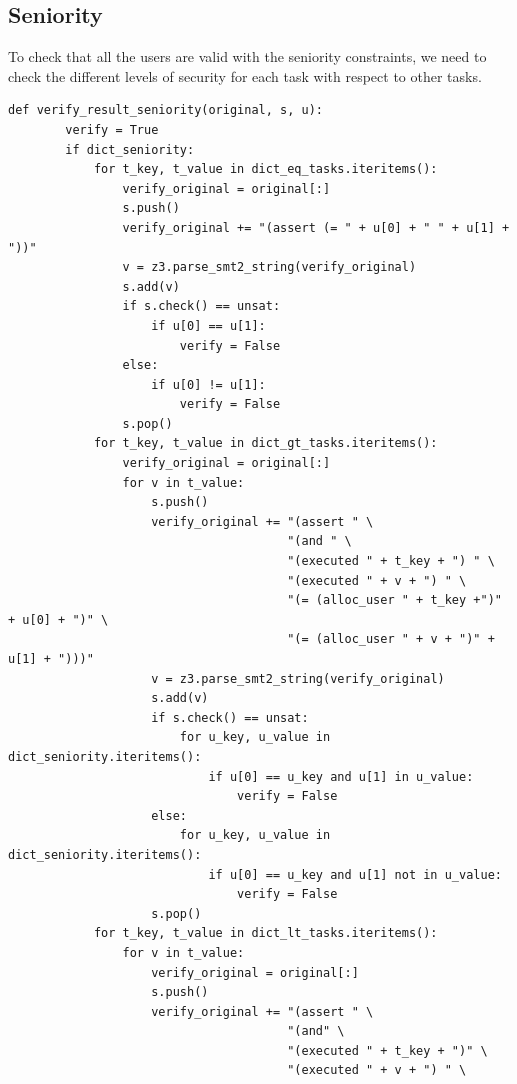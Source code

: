 \documentclass[a4paper]{report}
\begin{document}
\subsection{Seniority}
To check that all the users are valid with the seniority constraints, we need to check the different levels of security for each task with respect to other tasks. 

\begin{lstlisting}[frame=single]
def verify_result_seniority(original, s, u):
        verify = True
        if dict_seniority:
            for t_key, t_value in dict_eq_tasks.iteritems():
                verify_original = original[:]
                s.push()
                verify_original += "(assert (= " + u[0] + " " + u[1] + "))"
                v = z3.parse_smt2_string(verify_original)
                s.add(v)
                if s.check() == unsat:
                    if u[0] == u[1]:
                        verify = False
                else:
                    if u[0] != u[1]:
                        verify = False
                s.pop()
            for t_key, t_value in dict_gt_tasks.iteritems():
                verify_original = original[:]
                for v in t_value:
                    s.push()
                    verify_original += "(assert " \
                                       "(and " \
                                       "(executed " + t_key + ") " \
                                       "(executed " + v + ") " \
                                       "(= (alloc_user " + t_key +")" + u[0] + ")" \
                                       "(= (alloc_user " + v + ")" + u[1] + ")))"
                    v = z3.parse_smt2_string(verify_original)
                    s.add(v)
                    if s.check() == unsat:
                        for u_key, u_value in dict_seniority.iteritems():
                            if u[0] == u_key and u[1] in u_value:
                                verify = False
                    else:
                        for u_key, u_value in dict_seniority.iteritems():
                            if u[0] == u_key and u[1] not in u_value:
                                verify = False
                    s.pop()
            for t_key, t_value in dict_lt_tasks.iteritems():
                for v in t_value:
                    verify_original = original[:]
                    s.push()
                    verify_original += "(assert " \
                                       "(and" \
                                       "(executed " + t_key + ")" \
                                       "(executed " + v + ") " \

\end{lstlisting}
\end{document}

